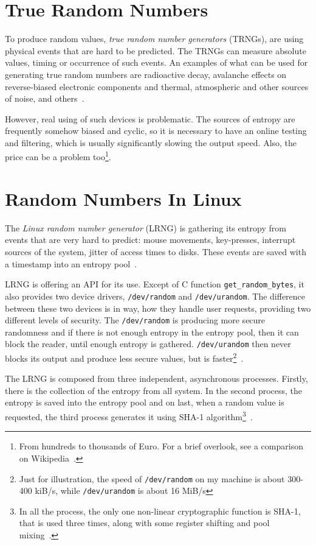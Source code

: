 \section{True Random Numbers}
To produce random values, {\em true random number generators} (TRNGs), are using physical events that are hard to be predicted. The TRNGs can measure absolute values, timing or occurrence of such events.
An examples of what can be used for generating true random numbers are radioactive decay, avalanche effects on reverse-biased electronic components and thermal, atmospheric and other sources of noise, and others~\cite[p.~6]{AnalysisOfEntropyLevels}.

However, real using of such devices is problematic. The sources of entropy are frequently somehow biased and cyclic, so it is necessary to have an online testing and filtering, which is usually significantly slowing the output speed. Also, the price can be a problem too\footnote{From hundreds to thousands of Euro. For a brief overlook, see a comparison on Wikipedia~\cite{HWRNGComparison}. }.


\section{Random Numbers In Linux}\label{sec:randomNumbers:linux}
The {\em Linux random number generator} (LRNG) is gathering its entropy from events that are very hard to predict: mouse movements, key-presses, interrupt sources of the system, jitter of access times to disks. These events are saved with a timestamp into an entropy pool~\cite{AnalysisOfLinuxRNG}.

LRNG is offering an API for its use. Except of C function {\tt get\_random\_bytes}, it also provides two device drivers, {\tt /dev/random} and {\tt /dev/urandom}. The difference between these two devices is in way, how they handle user requests, providing two different levels of security. The {\tt /dev/random} is producing more secure randomness and if there is not enough entropy in the entropy pool, then it can block the reader, until enough entropy is gathered. {\tt /dev/urandom} then never blocks its output and produce less secure values, but is faster\footnote{Just for illustration, the speed of {\tt /dev/random} on my machine is about 300-400 kiB/s, while {\tt /dev/urandom} is about 16 MiB/s}~\cite[chapter~1]{AnalysisOfLinuxRNG}. 

The LRNG is composed from three independent, asynchronous processes. Firstly, there is the collection of the entropy from all system. In the second process, the entropy is saved into the entropy pool and on last, when a random value is requested, the third process generates it using SHA-1 algorithm\footnote{In all the process, the only one non-linear cryptographic function is SHA-1, that is used three times, along with some register shifting and pool mixing~\cite[section~2.6]{AnalysisOfLinuxRNG}.}~\cite[chapter~2]{AnalysisOfLinuxRNG}.

